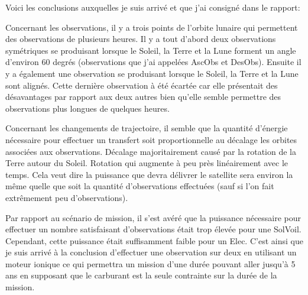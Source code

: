 \documentclass[11pt]{article} %
\begin{document}
		Voici les conclusions auxquelles je suis arrivé et que j'ai consigné dans le rapport: 
		
		Concernant les observations, il y a trois points de l'orbite lunaire qui permettent des observations de plusieurs heures. Il y a tout d'abord deux observations symétriques se produisant lorsque le Soleil, la Terre et la Lune forment un angle d'environ 60 degrés (observations que j'ai appelées \gls{AscObs} et \gls{DesObs}). Ensuite il y a également une observation se produisant lorsque le Soleil, la Terre et la Lune sont alignés. Cette dernière observation à été écartée car elle présentait des désavantages par rapport aux deux autres bien qu'elle semble permettre des observations plus longues de quelques heures.
		
		Concernant les changements de trajectoire, il semble que la quantité d'énergie nécessaire pour effectuer un transfert soit proportionnelle au décalage  les orbites associées aux observations. Décalage majoritairement causé par la rotation de la Terre autour du Soleil. Rotation qui augmente à peu près linéairement avec le temps. Cela veut dire la puissance que devra délivrer le satellite sera environ la même quelle que soit la quantité d'observations effectuées (sauf si l'on fait extrêmement peu d'observations).
		
		Par rapport au scénario de mission, il s'est avéré que la puissance nécessaire pour effectuer un nombre satisfaisant d'observations était trop élevée pour une \gls{SolVoil}. Cependant, cette puissance était suffisamment faible pour un \gls{Elec}. C'est ainsi que je suis arrivé à la conclusion d'effectuer une observation sur deux en utilisant un moteur ionique ce qui permettra un mission d'une durée pouvant aller jusqu'à 5 ans en supposant que le carburant est la seule contrainte sur la durée de la mission.
		
		
\end{document}
